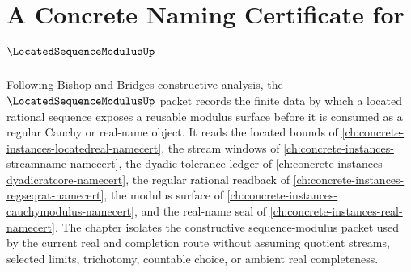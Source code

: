 \chapter{A Concrete Naming Certificate for $\LocatedSequenceModulusUp$}
\label{ch:concrete-instances-located-sequence-modulus-namecert}

Following Bishop and Bridges constructive analysis, the $\LocatedSequenceModulusUp$ packet records the finite data by which a located rational sequence exposes a reusable modulus surface before it is consumed as a regular Cauchy or real-name object. It reads the located bounds of \autoref{ch:concrete-instances-locatedreal-namecert}, the stream windows of \autoref{ch:concrete-instances-streamname-namecert}, the dyadic tolerance ledger of \autoref{ch:concrete-instances-dyadicratcore-namecert}, the regular rational readback of \autoref{ch:concrete-instances-regseqrat-namecert}, the modulus surface of \autoref{ch:concrete-instances-cauchymodulus-namecert}, and the real-name seal of \autoref{ch:concrete-instances-real-namecert}. The chapter isolates the constructive sequence-modulus packet used by the current real and completion route without assuming quotient streams, selected limits, trichotomy, countable choice, or ambient real completeness.


